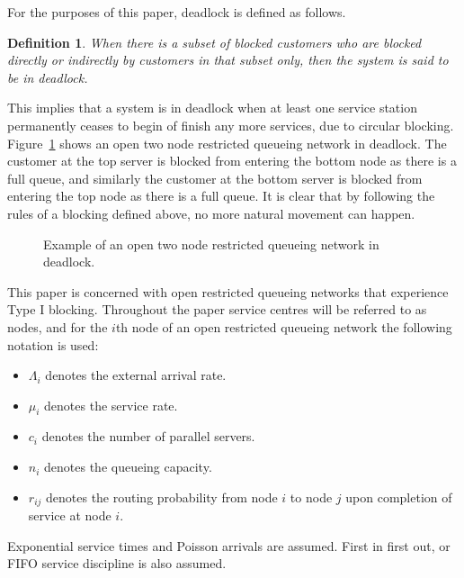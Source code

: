 \documentclass{article}
\newtheorem{definition}{Definition}
\numberwithin{equation}{section}
\begin{document}
For the purposes of this paper, deadlock is defined as follows.\\

\begin{definition}
    When there is a subset of blocked customers who are blocked directly or
    indirectly by customers in that subset only, then the system is said
    to be in deadlock.
\end{definition}

This implies that a system is in deadlock when at least one service station
permanently ceases to begin of finish any more services, due to circular
blocking.
Figure~\ref{fig:1st_example} shows an open two node restricted queueing
network in deadlock.
The customer at the top server is blocked from entering the bottom node as
there is a full queue, and similarly the customer at the bottom server is
blocked from entering the top node as there is a full queue.
It is clear that by following the rules of a blocking defined above, no more
natural movement can happen.

\begin{figure}[!htbp]
  \begin{center}
  
  \end{center}
  \caption{Example of an open two node restricted queueing network in deadlock.}
  \label{fig:1st_example}
\end{figure}

This paper is concerned with open restricted queueing networks that experience
Type I blocking.
Throughout the paper service centres will be referred to as nodes, and for the
$i$th node of an open restricted queueing network the following notation is
used:

\begin{itemize}
  \item $\Lambda_i$ denotes the external arrival rate.
  \item $\mu_i$ denotes the service rate.
  \item $c_i$ denotes the number of parallel servers.
  \item $n_i$ denotes the queueing capacity.
  \item $r_{ij}$ denotes the routing probability from node $i$ to node $j$
  upon completion of service at node $i$.
\end{itemize}

Exponential service times and Poisson arrivals are assumed.
First in first out, or FIFO service discipline is also assumed.
\end{document}
